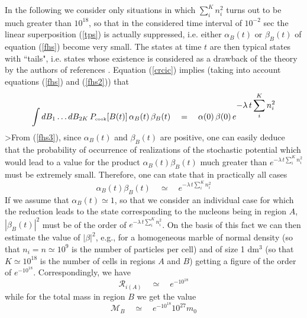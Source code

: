\documentclass[10pt,a4paper]{article}
\begin{document}
In the following we consider only situations in which
$\sum_{i}^{K}n^{2}_{i}$ turns out to be much greater than
$10^{18}$, so that in the considered time interval of $10^{-2}$
sec the linear superposition (\ref{tps}) is actually suppressed,
i.e. either $\alpha_{B}(t)$ or $\beta_{B}(t)$ of equation
(\ref{fhs}) become very small. The states at time $t$ are then
typical states with ``tails", i.e. states whose existence is
considered as a drawback of the theory by the authors of
references \cite{shi90,alo1,lew,cli1,cli2}. Equation (\ref{crcic})
implies (taking into account equations (\ref{fhs}) and
(\ref{fhs2})) that
\begin{equation} \label{fhs3}
\int dB_{1} \ldots dB_{2K}\, P_{\makebox{\tiny cook}}[B(t)]\,
\alpha_{B}(t)\, \beta_{B}(t) \quad = \quad \alpha(0)\,\beta(0) \,
e^{\displaystyle -\lambda\, t \sum_{i}^{K} n^{2}_{i}}
\end{equation}
>From (\ref{fhs3}), since $\alpha_{B}(t)$ and $\beta_{B}(t)$ are
positive, one can easily deduce that the probability of occurrence
of realizations of the stochastic potential which would lead to a
value for the product $\alpha_{B}(t) \beta_{B}(t)$  much greater
than $e^{-\lambda\, t \sum_{i}^{K} n^{2}_{i}}$ must be extremely
small. Therefore, one can state that in practically all cases
\begin{equation}
\alpha_{B}(t) \beta_{B}(t) \quad \simeq \quad e^{\displaystyle
-\lambda\, t \sum_{i}^{K} n^{2}_{i}}
\end{equation}
If we assume that $\alpha_{B}(t) \simeq 1$, so that we consider an
individual case for which the reduction leads to the state
corresponding to the nucleons being in region $A$,
$|\beta_{B}(t)|^{2}$  must be of the order of $e^{-\lambda\, t
\sum_{i}^{K} n^{2}_{i}}$.  On the basis of this fact we can then
estimate the value of $|\beta|^{2}$, e.g., for a homogeneous
marble of normal density (so that $n_{i} = n \simeq 10^{9}$ is the
number of particles per cell) and of size 1 dm$^{3}$ (so that $K
\simeq 10^{18}$ is the number of cells in regions $A$ and $B$)
getting a figure of the order of $e^{-10^{18}}$. Correspondingly,
we have
\begin{equation} \label{efr}
{\mathcal R}_{i(A)} \quad \simeq \quad e^{\displaystyle -10^{18}}
\end{equation}
while for the total mass in region $B$ we get the value
\begin{equation} \label{efm}
{\mathcal M}_{B} \quad \simeq \quad e^{\displaystyle -10^{18}}
10^{27} m_{0}
\end{equation}
\end{document}
